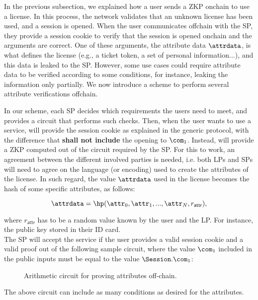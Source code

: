 
In the previous subsection, we explained how a user sends a ZKP onchain to use a license. In this process, the network validates that an unknown license has been used, and a session is opened. When the user communicates offchain with the SP, they provide a session cookie to verify that the session is opened onchain and the arguments are correct. One of these arguments, the attribute data $\attrdata$, is what defines the license (e.g., a ticket token, a set of personal information...), and this data is leaked to the SP. However, some use cases could require attribute data to be verified according to some conditions, for instance, leaking the information only partially. We now introduce a scheme to perform several attribute verifications offchain.

In our scheme, each SP decides which requirements the users need to meet, and provides a circuit that performs such checks. Then, when the user wants to use a service, will provide the session cookie as explained in the generic protocol, with the difference that \textbf{shall not include} the opening to $\com_1$. Instead, will provide a ZKP computed out of the circuit required by the SP. For this to work, an agreement between the different involved parties is needed, i.e. both LPs and SPs will need to agree on the language (or encoding) used to create the attributes of the license. In such regard, the value $\attrdata$ used in the license becomes the hash of some specific attributes, as follows:

$$\attrdata = \hp(\attr_0, \attr_1, ..., \attr_N, r_\mathsf{attr}),$$

where $r_\mathsf{attr}$ has to be a random value known by the user and the LP. For instance, the public key stored in their ID card.\\

The SP will accept the service if the user provides a valid session cookie and a valid proof out of the following sample circuit, where the value $\com_1$ included in the public inputs must be equal to the value $\Session.\com_1$:

\begin{figure}[h]
	\centering
	\setlength{\fboxsep}{5pt}%
	\setlength{\fboxrule}{0.3pt}%
	\caption{Arithmetic circuit for proving attributes off-chain.}
	\label{fig:circuit-offchain}
\end{figure}

The above circuit can include as many conditions as desired for the attributes.